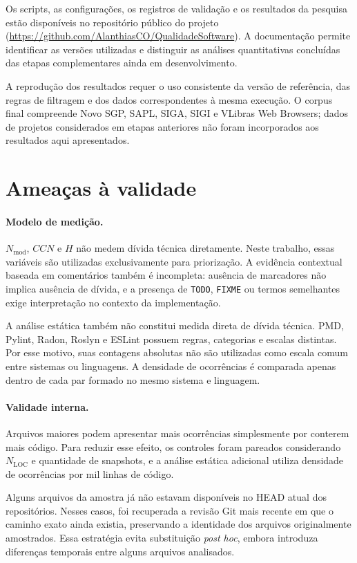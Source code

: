 \documentclass[12pt]{article}
\newcommand{\Nmod}{\ensuremath{N_{\mathrm{mod}}}}
\newcommand{\NLOC}{\ensuremath{N_{\mathrm{LOC}}}}
\newcommand{\CCN}{\ensuremath{CCN}}
\begin{document}
Os scripts, as configurações, os registros de validação e os resultados da pesquisa estão disponíveis no repositório público do projeto (\url{https://github.com/AlanthiasCO/QualidadeSoftware}). A documentação permite identificar as versões utilizadas e distinguir as análises quantitativas concluídas das etapas complementares ainda em desenvolvimento.

A reprodução dos resultados requer o uso consistente da versão de referência, das regras de filtragem e dos dados correspondentes à mesma execução. O corpus final compreende Novo SGP, SAPL, SIGA, SIGI e VLibras Web Browsers; dados de projetos considerados em etapas anteriores não foram incorporados aos resultados aqui apresentados.

\section{Ameaças à validade}
\paragraph{Modelo de medição.} \Nmod{}, \CCN{} e $H$ não medem dívida técnica diretamente. Neste trabalho, essas variáveis são utilizadas exclusivamente para priorização. A evidência contextual baseada em comentários também é incompleta: ausência de marcadores não implica ausência de dívida, e a presença de \texttt{TODO}, \texttt{FIXME} ou termos semelhantes exige interpretação no contexto da implementação.

A análise estática também não constitui medida direta de dívida técnica. PMD, Pylint, Radon, Roslyn e ESLint possuem regras, categorias e escalas distintas. Por esse motivo, suas contagens absolutas não são utilizadas como escala comum entre sistemas ou linguagens. A densidade de ocorrências é comparada apenas dentro de cada par formado no mesmo sistema e linguagem.

\paragraph{Validade interna.} Arquivos maiores podem apresentar mais ocorrências simplesmente por conterem mais código. Para reduzir esse efeito, os controles foram pareados considerando \NLOC{} e quantidade de snapshots, e a análise estática adicional utiliza densidade de ocorrências por mil linhas de código.

Alguns arquivos da amostra já não estavam disponíveis no HEAD atual dos repositórios. Nesses casos, foi recuperada a revisão Git mais recente em que o caminho exato ainda existia, preservando a identidade dos arquivos originalmente amostrados. Essa estratégia evita substituição \emph{post hoc}, embora introduza diferenças temporais entre alguns arquivos analisados.
\end{document}
